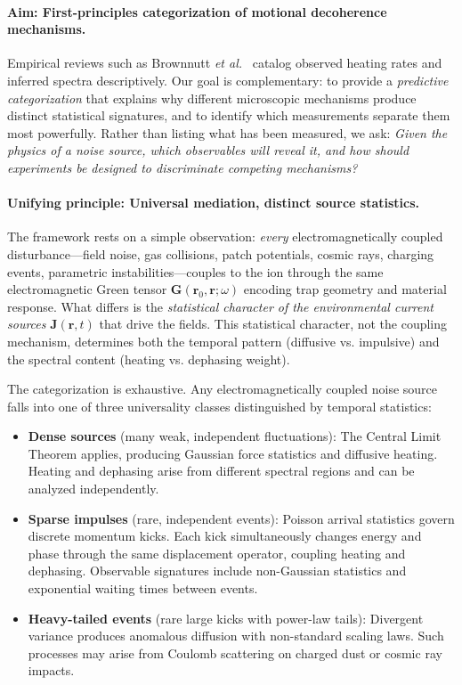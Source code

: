 \paragraph{Aim: First-principles categorization of motional decoherence mechanisms.} 
Empirical reviews such as Brownnutt \textit{et al.}~\cite{Brownnutt2015} catalog observed heating rates and inferred spectra descriptively. Our goal is complementary: to provide a \emph{predictive categorization} that explains why different microscopic mechanisms produce distinct statistical signatures, and to identify which measurements separate them most powerfully. Rather than listing what has been measured, we ask: \emph{Given the physics of a noise source, which observables will reveal it, and how should experiments be designed to discriminate competing mechanisms?}

\paragraph{Unifying principle: Universal mediation, distinct source statistics.}
The framework rests on a simple observation: \emph{every} electromagnetically coupled disturbance—field noise, gas collisions, patch potentials, cosmic rays, charging events, parametric instabilities—couples to the ion through the same electromagnetic Green tensor $\mathbf{G}(\mathbf{r}_0,\mathbf{r};\omega)$ encoding trap geometry and material response. What differs is the \emph{statistical character of the environmental current sources} $\mathbf{J}(\mathbf{r},t)$ that drive the fields. This statistical character, not the coupling mechanism, determines both the temporal pattern (diffusive vs. impulsive) and the spectral content (heating vs. dephasing weight).

The categorization is exhaustive. Any electromagnetically coupled noise source falls into one of three universality classes distinguished by temporal statistics:

\begin{itemize}[leftmargin=*,nosep]
\item \textbf{Dense sources} (many weak, independent fluctuations): The Central Limit Theorem applies, producing Gaussian force statistics and diffusive heating. Heating and dephasing arise from different spectral regions and can be analyzed independently.

\item \textbf{Sparse impulses} (rare, independent events): Poisson arrival statistics govern discrete momentum kicks. Each kick simultaneously changes energy and phase through the same displacement operator, coupling heating and dephasing. Observable signatures include non-Gaussian statistics and exponential waiting times between events.

\item \textbf{Heavy-tailed events} (rare large kicks with power-law tails): Divergent variance produces anomalous diffusion with non-standard scaling laws. Such processes may arise from Coulomb scattering on charged dust or cosmic ray impacts.
\end{itemize}

